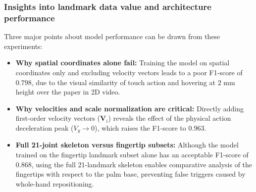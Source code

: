 \begin{table}[htbp]
\centering
\caption{Ablation evaluation of MediaPipe landmark subsets and kinematic feature representations.}
\label{tab:landmark_feature_ablation}
\end{table}

\subsubsection{Insights into landmark data value and architecture performance}
Three major points about model performance can be drawn from these experiments:
\begin{itemize}
    \item \textbf{Why spatial coordinates alone fail:} Training the model on spatial coordinates only and excluding velocity vectors leads to a poor F1-score of $0.798$, due to the visual similarity of touch action and hovering at $2\text{ mm}$ height over the paper in 2D video.
    \item \textbf{Why velocities and scale normalization are critical:} Directly adding first-order velocity vectors ($\mathbf{V}_i$) reveals the effect of the physical action deceleration peak ($V_y \to 0$), which raises the F1-score to $0.963$.
    \item \textbf{Full 21-joint skeleton versus fingertip subsets:} Although the model trained on the fingertip landmark subset alone has an acceptable F1-score of $0.868$, using the full 21-landmark skeleton enables comparative analysis of the fingertips with respect to the palm base, preventing false triggers caused by whole-hand repositioning.
\end{itemize}

